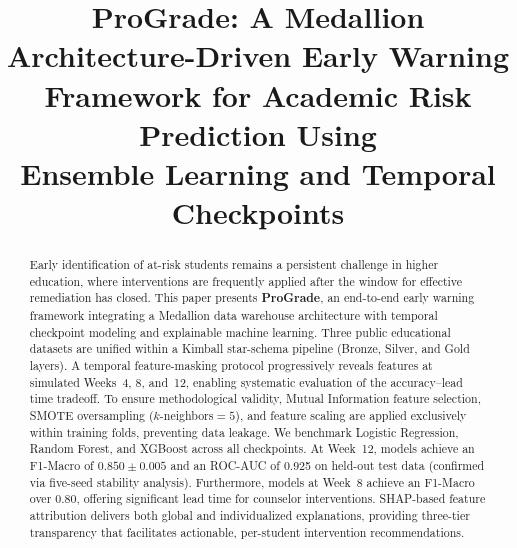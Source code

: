 \documentclass[conference,a4paper]{IEEEtran}
\begin{document}
\title{ProGrade: A Medallion Architecture-Driven Early Warning\\Framework for Academic Risk Prediction Using\\Ensemble Learning and Temporal Checkpoints}

\author{

}
\maketitle

\begin{abstract}
Early identification of at-risk students remains a persistent challenge in higher education, where interventions are frequently applied after the window for effective remediation has closed. This paper presents \textbf{ProGrade}, an end-to-end early warning framework integrating a Medallion data warehouse architecture with temporal checkpoint modeling and explainable machine learning. Three public educational datasets are unified within a Kimball star-schema pipeline (Bronze, Silver, and Gold layers). A temporal feature-masking protocol progressively reveals features at simulated Weeks~4, 8, and~12, enabling systematic evaluation of the accuracy--lead time tradeoff. To ensure methodological validity, Mutual Information feature selection, SMOTE oversampling ($k$-neighbors${=}5$), and feature scaling are applied exclusively within training folds, preventing data leakage. We benchmark Logistic Regression, Random Forest, and XGBoost across all checkpoints. At Week~12, models achieve an F1-Macro of $0.850 \pm 0.005$ and an ROC-AUC of 0.925 on held-out test data (confirmed via five-seed stability analysis). Furthermore, models at Week~8 achieve an F1-Macro over 0.80, offering significant lead time for counselor interventions. SHAP-based feature attribution delivers both global and individualized explanations, providing three-tier transparency that facilitates actionable, per-student intervention recommendations.
\end{abstract}
\end{document}
